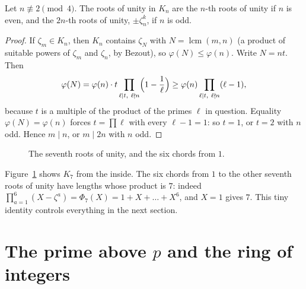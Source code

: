 \begin{proposition}\label{prop:muKn}
Let $n\not\equiv2\pmod 4$. The roots of unity in $K_n$ are the $n$-th roots of unity if $n$ is even, and the $2n$-th roots
of unity, $\pm\zeta_n^k$, if $n$ is odd.
\end{proposition}
\begin{proof}
If $\zeta_m\in K_n$, then $K_n$ contains $\zeta_N$ with $N=\operatorname{lcm}(m,n)$ (a product of suitable powers of
$\zeta_m$ and $\zeta_n$, by Bezout), so $\varphi(N)\le\varphi(n)$. Write $N=nt$. Then
\[
\varphi(N)=\varphi(n)\cdot t\prod_{\ell\mid t,\ \ell\nmid n}\Bigl(1-\frac1\ell\Bigr)\ge\varphi(n)\prod_{\ell\mid t,\ \ell\nmid n}(\ell-1),
\]
because $t$ is a multiple of the product of the primes $\ell$ in question. Equality $\varphi(N)=\varphi(n)$ forces
$t=\prod\ell$ with every $\ell-1=1$: so $t=1$, or $t=2$ with $n$ odd. Hence $m\mid n$, or $m\mid2n$ with $n$ odd.
\end{proof}

\begin{figure}[ht]
\centering
{}
\caption{The seventh roots of unity, and the six chords from $1$.}
\label{fig:roots}
\end{figure}

Figure~\ref{fig:roots} shows $K_7$ from the inside. The six chords from $1$ to the other seventh roots of unity have lengths
whose product is $7$: indeed $\prod_{a=1}^{6}(X-\zeta^a)=\Phi_7(X)=1+X+\dots+X^6$, and $X=1$ gives $7$. This tiny identity
controls everything in the next section.

\section{The prime above $p$ and the ring of integers}

